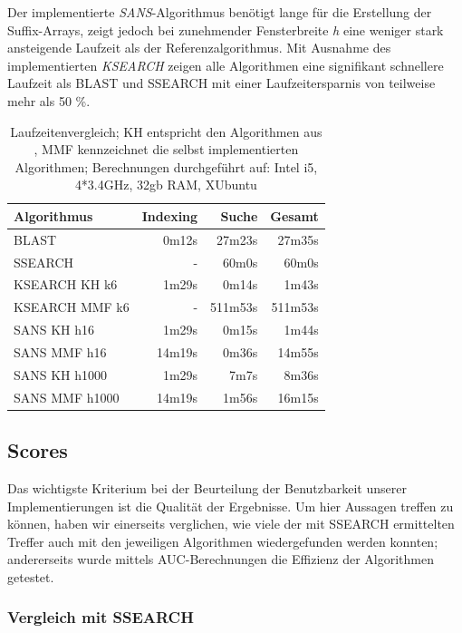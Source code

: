 \documentclass{article}
\begin{document}
Der implementierte \emph{SANS}-Algorithmus benötigt lange für die Erstellung der Suffix-Arrays, zeigt jedoch bei zunehmender Fensterbreite \textit h 
eine weniger stark ansteigende Laufzeit als der Referenzalgorithmus. Mit Ausnahme des implementierten \emph{KSEARCH} zeigen alle Algorithmen eine 
signifikant schnellere Laufzeit als BLAST und SSEARCH mit einer Laufzeitersparnis von teilweise mehr als 50 \%.
  \begin{table}[h]
    \caption{Laufzeitenvergleich; KH entspricht den Algorithmen aus \cite{Holm}, MMF kennzeichnet die selbst implementierten Algorithmen; Berechnungen durchgeführt auf: Intel i5, 4*3.4GHz, 32gb RAM, XUbuntu}
    \begin{center}
    \begin{tabular}{lrrr}
    \hline
    Algorithmus & Indexing & Suche & Gesamt\\
    \hline
    BLAST & 0m12s & 27m23s & 27m35s\\
    SSEARCH & - & 60m0s & 60m0s\\
    KSEARCH KH k6 & 1m29s & 0m14s & 1m43s\\
    KSEARCH MMF k6 & -  & 511m53s & 511m53s\\
    SANS KH h16 & 1m29s &  0m15s & 1m44s\\
    SANS MMF  h16 & 14m19s & 0m36s & 14m55s\\
    SANS KH h1000 & 1m29s & 7m7s & 8m36s\\
    SANS MMF  h1000 & 14m19s & 1m56s & 16m15s\\
    \hline
    \end{tabular}
    \label{runtimes}
    \end{center}
  \end{table}

\subsection{Scores}

Das wichtigste Kriterium bei der Beurteilung der Benutzbarkeit unserer Implementierungen ist die Qualität der Ergebnisse. Um hier Aussagen treffen
zu können, haben wir einerseits verglichen, wie viele der mit SSEARCH ermittelten Treffer auch mit den jeweiligen Algorithmen wiedergefunden werden konnten; 
andererseits wurde mittels AUC-Berechnungen die Effizienz der Algorithmen getestet.

\subsubsection{Vergleich mit SSEARCH}
\end{document}
